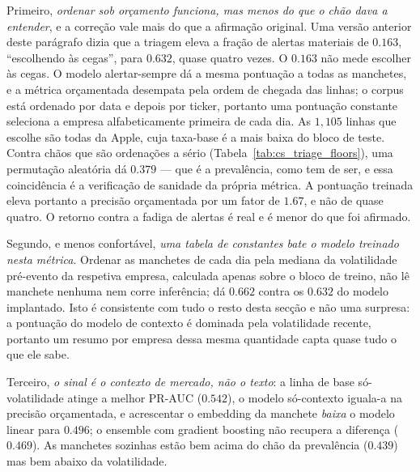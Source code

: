 Primeiro, \emph{ordenar sob orçamento funciona, mas menos do que o chão dava a entender}, e a
correção vale mais do que a afirmação original. Uma versão anterior deste parágrafo dizia que a
triagem eleva a fração de alertas materiais de $0.163$, ``escolhendo às cegas'', para $0.632$, quase
quatro vezes. O $0.163$ não mede escolher às cegas. O modelo alertar-sempre dá a mesma pontuação a
todas as manchetes, e a métrica orçamentada desempata pela ordem de chegada das linhas; o corpus está
ordenado por data e depois por ticker, portanto uma pontuação constante seleciona a empresa
alfabeticamente primeira de cada dia. As $1{,}105$ linhas que escolhe são todas da Apple, cuja
taxa-base é a mais baixa do bloco de teste. Contra chãos que são ordenações a sério
(Tabela~\ref{tab:cs_triage_floors}), uma permutação aleatória dá $0.379$ --- que é a prevalência,
como tem de ser, e essa coincidência é a verificação de sanidade da própria métrica. A pontuação
treinada eleva portanto a precisão orçamentada por um fator de $1.67$, e não de quase quatro. O
retorno contra a fadiga de alertas é real e é menor do que foi afirmado.

Segundo, e menos confortável, \emph{uma tabela de constantes bate o modelo treinado nesta métrica}.
Ordenar as manchetes de cada dia pela mediana da volatilidade pré-evento da respetiva empresa,
calculada apenas sobre o bloco de treino, não lê manchete nenhuma nem corre inferência; dá $0.662$
contra os $0.632$ do modelo implantado. Isto é consistente com tudo o resto desta secção e não uma
surpresa: a pontuação do modelo de contexto é dominada pela volatilidade recente, portanto um resumo
por empresa dessa mesma quantidade capta quase tudo o que ele sabe.

Terceiro, \emph{o sinal é o contexto de mercado, não o texto}: a linha de base só-volatilidade atinge
a melhor PR-AUC ($0.542$), o modelo só-contexto iguala-a na precisão orçamentada, e acrescentar o
embedding da manchete \emph{baixa} o modelo linear para $0.496$; o ensemble com gradient boosting não
recupera a diferença ($0.469$). As manchetes sozinhas estão bem acima do chão da prevalência
($0.439$) mas bem abaixo da volatilidade.

